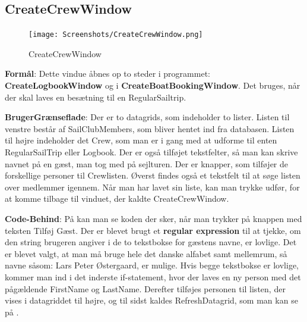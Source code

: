 \subsection{CreateCrewWindow}

\begin{figure}
    \vspace{-20pt}
    \begin{center}
        \texttt{[image: Screenshots/CreateCrewWindow.png]}
    \end{center}
    \vspace{-20pt}
    \caption{CreateCrewWindow}
    \vspace{-30pt}
\end{figure}

\textbf{Formål}: Dette vindue åbnes op to steder i programmet: \textbf{CreateLogbookWindow} og i \textbf{CreateBoatBookingWindow}. Det bruges, når der skal laves en besætning til en RegularSailtrip.  

\textbf{BrugerGrænseflade}: Der er to datagrids, som indeholder to lister. Listen til venstre består af SailClubMembers, som bliver hentet ind fra databasen. Listen til højre indeholder det Crew, som man er i gang med at udforme til enten RegularSailTrip eller Logbook. Der er også tilføjet tekstfelter, så man kan skrive navnet på en gæst, man tog med på sejlturen. Der er knapper, som tilføjer de forskellige personer til Crewlisten. Øverst findes også et tekstfelt til at søge listen over medlemmer igennem. Når man har lavet sin liste, kan man trykke udfør, for at komme tilbage til vinduet, der kaldte CreateCrewWindow.

\textbf{Code-Behind}: 
På  kan man se koden der sker, når man trykker på knappen med teksten Tilføj Gæst.
Der er blevet brugt et \textbf{regular expression} til at tjekke, om den string brugeren angiver i de to tekstbokse for gæstens navne, er lovlige. 
Det er blevet valgt, at man må bruge hele det danske alfabet samt mellemrum, så navne såsom: Lars Peter Østergaard, er mulige.
Hvis begge tekstbokse er lovlige, kommer man ind i det inderste if-statement, hvor der laves en ny person med det pågældende FirstName og LastName. 
Derefter tilføjes personen til listen, der vises i datagriddet til højre, og til sidst kaldes RefreshDatagrid, som man kan se på .

